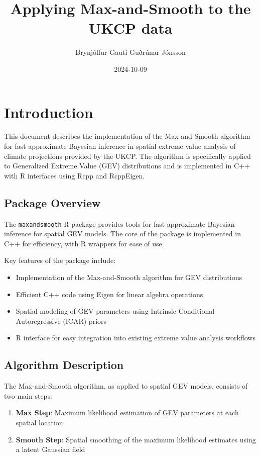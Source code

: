 \documentclass[
  letterpaper,
  DIV=11,
  numbers=noendperiod]{scrartcl}
\title{Applying Max-and-Smooth to the UKCP data}
\author{Brynjólfur Gauti Guðrúnar Jónsson}
\date{2024-10-09}
\providecommand{\tightlist}{%
  \setlength{\itemsep}{0pt}\setlength{\parskip}{0pt}}\usepackage{longtable,booktabs,array}
\begin{document}
\maketitle


\section{Introduction}\label{introduction}

This document describes the implementation of the Max-and-Smooth
algorithm for fast approximate Bayesian inference in spatial extreme
value analysis of climate projections provided by the UKCP. The
algorithm is specifically applied to Generalized Extreme Value (GEV)
distributions and is implemented in C++ with R interfaces using Rcpp and
RcppEigen.

\subsection{Package Overview}\label{package-overview}

The \texttt{maxandsmooth} R package provides tools for fast approximate
Bayesian inference for spatial GEV models. The core of the package is
implemented in C++ for efficiency, with R wrappers for ease of use.

Key features of the package include:

\begin{itemize}
\tightlist
\item
  Implementation of the Max-and-Smooth algorithm for GEV distributions
\item
  Efficient C++ code using Eigen for linear algebra operations
\item
  Spatial modeling of GEV parameters using Intrinsic Conditional
  Autoregressive (ICAR) priors
\item
  R interface for easy integration into existing extreme value analysis
  workflows
\end{itemize}

\subsection{Algorithm Description}\label{algorithm-description}

The Max-and-Smooth algorithm, as applied to spatial GEV models, consists
of two main steps:

\begin{enumerate}
\def\labelenumi{\arabic{enumi}.}
\tightlist
\item
  \textbf{Max Step}: Maximum likelihood estimation of GEV parameters at
  each spatial location
\item
  \textbf{Smooth Step}: Spatial smoothing of the maximum likelihood
  estimates using a latent Gaussian field
\end{enumerate}
\end{document}
